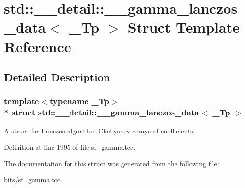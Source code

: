 \hypertarget{structstd_1_1____detail_1_1____gamma__lanczos__data}{}\section{std\+:\+:\+\_\+\+\_\+detail\+:\+:\+\_\+\+\_\+gamma\+\_\+lanczos\+\_\+data$<$ \+\_\+\+Tp $>$ Struct Template Reference}
\label{structstd_1_1____detail_1_1____gamma__lanczos__data}


\subsection{Detailed Description}
\subsubsection*{template$<$typename \+\_\+\+Tp$>$\\*
struct std\+::\+\_\+\+\_\+detail\+::\+\_\+\+\_\+gamma\+\_\+lanczos\+\_\+data$<$ \+\_\+\+Tp $>$}

A struct for Lanczos algorithm Chebyshev arrays of coefficients. 

Definition at line 1995 of file sf\+\_\+gamma.\+tcc.



The documentation for this struct was generated from the following file\+:\begin{DoxyCompactItemize}
\item 
bits/\hyperlink{sf__gamma_8tcc}{sf\+\_\+gamma.\+tcc}\end{DoxyCompactItemize}
